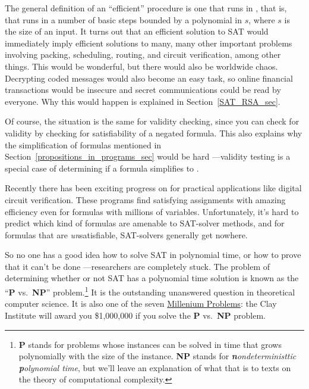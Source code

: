 The general definition of an ``efficient'' procedure is one that runs
in , that is, that runs in a number of basic
steps bounded by a polynomial in $s$, where $s$ is the size of an
input.  It turns out that an efficient solution to SAT would
immediately imply efficient solutions to many, many other important
problems involving packing, scheduling, routing, and circuit
verification, among other things.  This would be wonderful, but there
would also be worldwide chaos.  Decrypting coded messages would also
become an easy task, so online financial transactions would be
insecure and secret communications could be read by everyone.  Why
this would happen is explained in Section~\ref{SAT_RSA_sec}.

Of course, the situation is the same for validity checking, since you
can check for validity by checking for satisfiability of a negated
formula.  This also explains why the simplification of formulas
mentioned in Section~\ref{propositions_in_programs_sec} would be
hard ---validity testing is a special case of determining if a formula
simplifies to \true.

Recently there has been exciting progress on  for
practical applications like digital circuit verification.  These
programs find satisfying assignments with amazing efficiency even for
formulas with millions of variables.  Unfortunately, it's hard to
predict which kind of formulas are amenable to SAT-solver methods, and
for formulas that are \emph{un}satisfiable, SAT-solvers generally get
nowhere.

So no one has a good idea how to solve SAT in polynomial time, or how
to prove that it can't be done ---researchers are completely stuck.
The problem of determining whether or not SAT has a polynomial time
solution is known as the ``\textbf{P} vs.\ \textbf{NP}''
problem.\footnote{\textbf{P} stands for problems whose instances can
  be solved in time that grows polynomially with the size of the
  instance.  \textbf{NP} stands for  \emph{\textbf{n}ondeterministtic \textbf{p}olynomial time},
  but we'll leave an explanation of what that is to texts on the
  theory of computational complexity.}  It is the outstanding
unanswered question in theoretical computer science.  It is also one
of the seven \href{http://www.claymath.org/millennium/}{Millenium
  Problems}: the Clay Institute will award you \$1,000,000 if you
solve the \textbf{P} vs.\ \textbf{NP} problem.

\begin{problems}

\homeworkproblems
{}

\end{problems}

